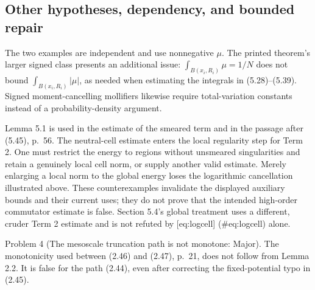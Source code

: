 \documentclass[10pt]{article}
\begin{document}
\subsection*{Other hypotheses, dependency, and bounded repair}
The two examples are independent and use nonnegative \(\mu\). The printed theorem’s larger signed class presents an additional issue: \(\int_{B(x_i,R_i)}\mu=1/N\) does not bound \(\int_{B(x_i,R_i)}|\mu|\), as needed when estimating the integrals in (5.28)–(5.39). Signed moment-cancelling mollifiers likewise require total-variation constants instead of a probability-density argument.\par
Lemma 5.1 is used in the estimate of the smeared term and in the passage after (5.45), p. 56. The neutral-cell estimate enters the local regularity step for Term 2. One must restrict the energy to regions without unsmeared singularities and retain a genuinely local cell norm, or supply another valid estimate. Merely enlarging a local norm to the global energy loses the logarithmic cancellation illustrated above. These counterexamples invalidate the displayed auxiliary bounds and their current uses; they do not prove that the intended high-order commutator estimate is false. Section 5.4’s global treatment uses a different, cruder Term 2 estimate and is not refuted by [eq:logcell] (\#eq:logcell) alone.\par
Problem 4 (The mesoscale truncation path is not monotone: Major).  The monotonicity used between (2.46) and (2.47), p. 21, does not follow from Lemma 2.2. It is false for the path (2.44), even after correcting the fixed-potential typo in (2.45).\par
\end{document}
